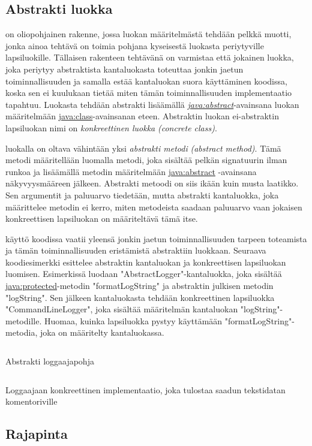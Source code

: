 \documentclass{tufte-book}
\newcommand{\eng}[1]{\textit{(#1)}}
\newcommand{\new}[1]{\textit{\gls{#1}}}
\newcommand{\neweng}[2]{\new{#1} \eng{#2}}
\newcommand{\java}[1]{\underline{\gls{java:#1}}}
\newcommand{\newjava}[1]{\textit{\java{#1}}}
\newcommand{\code}[3]{
\begin{listing}
    \inputminted{java}{OhjelmointiopasEsimerkit/src/#1/#2.java}
    \caption{#3}
    \label{Java-#1-#2}
\end{listing}
}
\begin{document}
\subsection{Abstrakti luokka}
\label{abstract}

 on oliopohjainen rakenne, jossa luokan määritelmästä tehdään
pelkkä muotti, jonka ainoa tehtävä on toimia pohjana kyseisestä luokasta periytyville
lapsiluokille. Tällaisen rakenteen tehtävänä on varmistaa että jokainen luokka, joka periytyy
abstraktista kantaluokasta toteuttaa jonkin jaetun toiminnallisuuden ja samalla estää kantaluokan
suora käyttäminen koodissa, koska sen ei kuulukaan tietää miten tämän toiminnallisuuden 
implementaatio tapahtuu. Luokasta tehdään abstrakti lisäämällä \newjava{abstract}-avainsana luokan
määritelmään \java{class}-avainsanan eteen. Abstraktin luokan ei-abstraktin lapsiluokan nimi on
\neweng{konkreettinen luokka}{concrete class}.

 luokalla on oltava vähintään yksi 
\neweng{abstrakti metodi}{abstract method}. Tämä metodi määritellään luomalla metodi, joka
sisältää pelkän signatuurin ilman runkoa ja lisäämällä metodin määritelmään \java{abstract}
-avainsana näkyvyysmääreen jälkeen. Abstrakti metoodi on siis ikään kuin musta laatikko. Sen
argumentit ja paluuarvo tiedetään, mutta abstrakti kantaluokka, joka määrittelee metodin ei
kerro, miten metodeista saadaan paluuarvo vaan jokaisen konkreettisen lapsiluokan on
määriteltävä tämä itse.

 käyttö koodissa vaatii yleensä jonkin jaetun toiminnallisuuden
tarpeen toteamista ja tämän toiminnallisuuden eristämistä abstraktiin luokkaan. Seuraava
koodiesimerkki esittelee abstraktin kantaluokan ja konkreettisen lapsiluokan luomisen. Esimerkissä
luodaan "AbstractLogger"-kantaluokka, joka sisältää \java{protected}-metodin "formatLogString" ja
abstraktin julkisen metodin "logString". Sen jälkeen kantaluokasta tehdään konkreettinen
lapsiluokka "CommandLineLogger", joka sisältää määritelmän kantaluokan "logString"-metodille.
Huomaa, kuinka lapsiluokka pystyy käyttämään "formatLogString"-metodia, joka on määritelty
kantaluokassa.

\code{week6/abstractexample}{AbstractLogger}{Abstrakti loggaajapohja}
\code{week6/abstractexample}{CommandLineLogger}{Loggaajaan konkreettinen implementaatio, joka
tulostaa saadun tekstidatan komentoriville}

\subsection{Rajapinta}
\label{interface}
\end{document}
